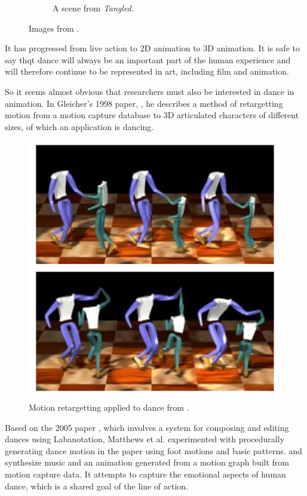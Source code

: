 \begin{figure}[h!]
\begin{subfigure}[b!]{0.3\textwidth}
                \label{fig:tangled}
                \caption{A scene from \textit{Tangled.}}
        \end{subfigure}%
        \caption{Images from \protect{}.}
	\label{fig:danceinmovies}
\end{figure}

It has progressed from live action to 2D animation to 3D animation. It is safe to say thqt dance will always be an important part of the human experience and will therefore continue to be represented in art, including film and animation.

So it seems almost obvious that researchers must also be interested in dance in animation. In Gleicher's 1998 paper, \citep{gleicher1998retargetting}, he describes a method of retargetting motion from a motion capture database to 3D articulated characters of different sizes, of which an application is dancing.

\begin{figure}[!h]
\centering
\includegraphics[scale=0.5]{img/retarget}
\caption{Motion retargetting applied to dance from \citep{gleicher1998retargetting}.}
\end{figure}

Based on the 2005 paper \citep{calvert2005applications}, which involves a system for composing and editing dances using Labanotation, Matthews  et al. experimented with procedurally generating dance motion in the paper \citep{matthews2011procedural} using foot motions and basic patterns. \citep{shiratori2006dancing} and \citep{shiratori2006synthesizing} synthesize music and an animation generated from a motion graph built from motion capture data. It attempts to capture the emotional aspects of human dance, which is a shared goal of the line of action.
